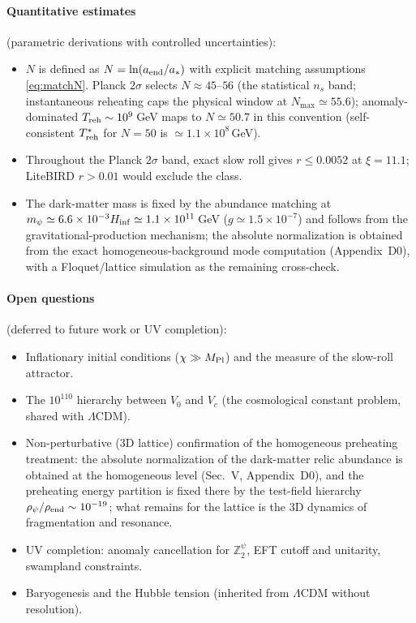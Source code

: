 \documentclass[pdflatex,sn-mathphys-num]{sn-jnl}
\newcommand{\MP}{M_{\rm Pl}}
\newcommand{\Ztwo}{\mathbb{Z}_2}
\newcommand{\Ztwopsi}{\Ztwo^{\psi}}
\theoremstyle{thmstyleone}
\begin{document}
\paragraph{Quantitative estimates} (parametric derivations with controlled uncertainties):
\begin{itemize}
\item $N$ is defined as $N=\ln(a_{\rm end}/a_*)$ with explicit matching assumptions \eqref{eq:matchN}. Planck $2\sigma$ selects $N\approx45$--$56$ (the statistical $n_s$ band; instantaneous reheating caps the physical window at $N_{\max}\simeq55.6$); anomaly-dominated $T_{\rm reh}\sim10^9\,$GeV maps to $N\simeq50.7$ in this convention (self-consistent $T_{\rm reh}^*$ for $N=50$ is $\simeq1.1\times10^{8}\,$GeV).
\item Throughout the Planck $2\sigma$ band, exact slow roll gives $r\leq0.0052$ at $\xi=11.1$; LiteBIRD $r>0.01$ would exclude the class.
\item The dark-matter mass is fixed by the abundance matching at $m_\psi\simeq6.6\times10^{-3}H_{\rm inf}\simeq1.1\times10^{11}\,$GeV ($g\simeq1.5\times10^{-7}$) and follows from the gravitational-production mechanism; the absolute normalization is obtained from the exact homogeneous-background mode computation (Appendix~D0), with a Floquet/lattice simulation as the remaining cross-check.
\end{itemize}

\paragraph{Open questions} (deferred to future work or UV completion):
\begin{itemize}
\item Inflationary initial conditions ($\chi\gg\MP$) and the measure of the slow-roll attractor.
\item The $10^{110}$ hierarchy between $V_0$ and $V_c$ (the cosmological constant problem, shared with $\Lambda$CDM).
\item Non-perturbative (3D lattice) confirmation of the homogeneous preheating treatment: the absolute normalization of the dark-matter relic abundance is obtained at the homogeneous level (Sec.~V, Appendix~D0), and the preheating energy partition is fixed there by the test-field hierarchy $\rho_\psi/\rho_{\rm end}\sim10^{-19}$; what remains for the lattice is the 3D dynamics of fragmentation and resonance.
\item UV completion: anomaly cancellation for $\Ztwopsi$, EFT cutoff and unitarity, swampland constraints.
\item Baryogenesis and the Hubble tension (inherited from $\Lambda$CDM without resolution).
\end{itemize}
\end{document}
